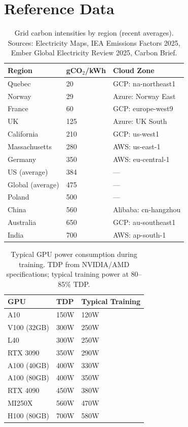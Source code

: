 \documentclass{article}
\theoremstyle{plain}
\theoremstyle{definition}
\theoremstyle{remark}
\begin{document}
\section{Reference Data}
\label{app:reference}

\begin{table}[!ht]
\caption{Grid carbon intensities by region (recent averages). Sources: Electricity Maps, IEA Emissions Factors 2025, Ember Global Electricity Review 2025, Carbon Brief.}
\label{tab:grid-intensity}
\begin{center}
\small
\begin{tabular}{p{3.5cm}p{2.5cm}p{5cm}}
\toprule
\textbf{Region} & \textbf{gCO$_2$/kWh} & \textbf{Cloud Zone} \\
\midrule
Quebec & 20 & GCP: na-northeast1 \\
Norway & 29 & Azure: Norway East \\
France & 60 & GCP: europe-west9 \\
UK & 125 & Azure: UK South \\
California & 210 & GCP: us-west1 \\
Massachusetts & 280 & AWS: us-east-1 \\
Germany & 350 & AWS: eu-central-1 \\
US (average) & 384 & --- \\
Global (average) & 475 & --- \\
Poland & 500 & --- \\
China & 560 & Alibaba: cn-hangzhou \\
Australia & 650 & GCP: au-southeast1 \\
India & 700 & AWS: ap-south-1 \\
\bottomrule
\end{tabular}
\end{center}
\end{table}

\begin{table}[!ht]
\caption{Typical GPU power consumption during training. TDP from NVIDIA/AMD specifications; typical training power at 80--85\% TDP.}
\label{tab:gpu-power}
\begin{center}
\small
\begin{tabular}{p{4cm}p{3cm}p{4cm}}
\toprule
\textbf{GPU} & \textbf{TDP} & \textbf{Typical Training} \\
\midrule
A10 & 150W & 120W \\
V100 (32GB) & 300W & 250W \\
L40 & 300W & 250W \\
RTX 3090 & 350W & 290W \\
A100 (40GB) & 400W & 330W \\
A100 (80GB) & 400W & 350W \\
RTX 4090 & 450W & 380W \\
MI250X & 560W & 470W \\
H100 (80GB) & 700W & 580W \\
\bottomrule
\end{tabular}
\end{center}
\end{table}
\end{document}
